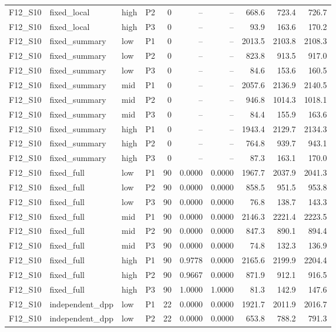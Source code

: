 \begin{longtable}{llllrrrrrr}
F12\_S10 & fixed\_local & high & P2 & 0 & -- & -- & 668.6 & 723.4 & 726.7 \\
F12\_S10 & fixed\_local & high & P3 & 0 & -- & -- & 93.9 & 163.6 & 170.2 \\
F12\_S10 & fixed\_summary & low & P1 & 0 & -- & -- & 2013.5 & 2103.8 & 2108.3 \\
F12\_S10 & fixed\_summary & low & P2 & 0 & -- & -- & 823.8 & 913.5 & 917.0 \\
F12\_S10 & fixed\_summary & low & P3 & 0 & -- & -- & 84.6 & 153.6 & 160.5 \\
F12\_S10 & fixed\_summary & mid & P1 & 0 & -- & -- & 2057.6 & 2136.9 & 2140.5 \\
F12\_S10 & fixed\_summary & mid & P2 & 0 & -- & -- & 946.8 & 1014.3 & 1018.1 \\
F12\_S10 & fixed\_summary & mid & P3 & 0 & -- & -- & 84.4 & 155.9 & 163.6 \\
F12\_S10 & fixed\_summary & high & P1 & 0 & -- & -- & 1943.4 & 2129.7 & 2134.3 \\
F12\_S10 & fixed\_summary & high & P2 & 0 & -- & -- & 764.8 & 939.7 & 943.1 \\
F12\_S10 & fixed\_summary & high & P3 & 0 & -- & -- & 87.3 & 163.1 & 170.0 \\
F12\_S10 & fixed\_full & low & P1 & 90 & 0.0000 & 0.0000 & 1967.7 & 2037.9 & 2041.3 \\
F12\_S10 & fixed\_full & low & P2 & 90 & 0.0000 & 0.0000 & 858.5 & 951.5 & 953.8 \\
F12\_S10 & fixed\_full & low & P3 & 90 & 0.0000 & 0.0000 & 76.8 & 138.7 & 143.3 \\
F12\_S10 & fixed\_full & mid & P1 & 90 & 0.0000 & 0.0000 & 2146.3 & 2221.4 & 2223.5 \\
F12\_S10 & fixed\_full & mid & P2 & 90 & 0.0000 & 0.0000 & 847.3 & 890.1 & 894.4 \\
F12\_S10 & fixed\_full & mid & P3 & 90 & 0.0000 & 0.0000 & 74.8 & 132.3 & 136.9 \\
F12\_S10 & fixed\_full & high & P1 & 90 & 0.9778 & 0.0000 & 2165.6 & 2199.9 & 2204.4 \\
F12\_S10 & fixed\_full & high & P2 & 90 & 0.9667 & 0.0000 & 871.9 & 912.1 & 916.5 \\
F12\_S10 & fixed\_full & high & P3 & 90 & 1.0000 & 1.0000 & 81.3 & 142.9 & 147.6 \\
F12\_S10 & independent\_dpp & low & P1 & 22 & 0.0000 & 0.0000 & 1921.7 & 2011.9 & 2016.7 \\
F12\_S10 & independent\_dpp & low & P2 & 22 & 0.0000 & 0.0000 & 653.8 & 788.2 & 791.3 \\

\end{longtable}
